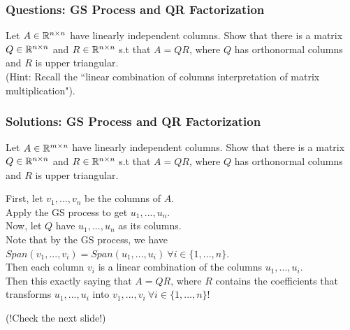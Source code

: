 \documentclass[table]{beamer}
\renewenvironment{enumerate}%
{\begin{list}{\arabic{enumi}.}%
      {\setlength{\leftmargin}{2.5em}%
       \setlength{\itemsep}{-\parsep}%
       \setlength{\topsep}{-\parskip}%
       \usecounter{enumi}}%
 }{\end{list}}
\begin{document}
\begin{frame}
\frametitle{Questions: GS Process and QR Factorization}
\begin{enumerate}
\item Let $A\in \mathbb{R}^{n\times n}$ have linearly independent columns. Show that there is a matrix $Q\in \mathbb{R}^{n \times n}$ and $R \in \mathbb{R}^{n\times n} $ s.t that $A=QR$, where $Q$ has orthonormal columns and $R$ is upper triangular. \\
\medskip
(Hint: Recall the ``linear combination of columns interpretation of matrix multiplication").
\end{enumerate}
\end{frame}

\begin{frame}

\begin{enumerate}
\frametitle{Solutions: GS Process and QR Factorization}

\item Let $A\in \mathbb{R}^{m\times n}$ have linearly independent columns. Show that there is a matrix $Q\in \mathbb{R}^{n\times n}$ and $R \in \mathbb{R}^{n\times n} $ s.t that $A=QR$, where $Q$ has orthonormal columns and $R$ is upper triangular. \\
\begin{solution}
First, let $v_1,...,v_n$ be the columns of $A$.\\
 Apply the GS process to get $u_1,...,u_n$. \\
 Now, let $Q$ have $u_1,...,u_n$ as its columns. \\
 Note that by the GS process, we have $Span(v_1,..., v_i) = Span(u_1,...,u_i)\ \forall i\in \{1,...,n\}$.\\
  Then each column $v_i$ is a linear combination of the columns $u_1,...,u_i$. \\
  Then this exactly saying that $A=QR$, where $R$ contains the coefficients that transforms $u_1,...,u_i$ into $v_1,...,v_i\ \forall i \in \{1,...,n\}$!
\end{solution}
\end{enumerate}
(!Check the next slide!)
\end{frame}
\end{document}
